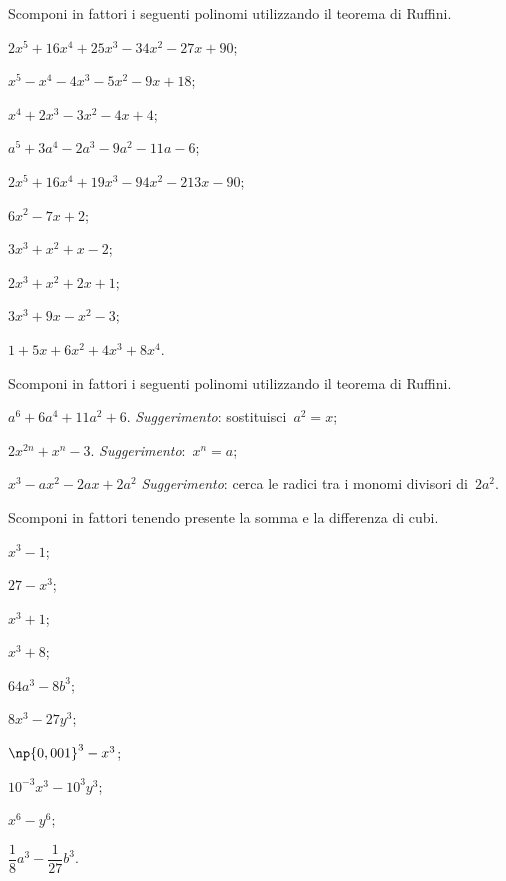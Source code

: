 \begin{esercizio}[\Ast]
\label{ese:13.83}
Scomponi in fattori i seguenti polinomi utilizzando il teorema di
Ruffini.
\begin{multicols}{2}
 \begin{enumeratea}
 \item $2x^{5}+16x^{4}+25x^{3}-34x^{2}-27x+90$;
\item $x^{5}-x^{4}-4x^{3}-5x^{2}-9x+18$;
\item $x^{4}+2x^{3}-3x^{2}-4x+4$;
\item $a^{5}+3a^{4}-2a^{3}-9a^{2}-11a-6$;
\item $2x^{5}+16x^{4}+19x^{3}-94x^{2}-213x-90$;
\item $6x^{2}-7x+2$;
\item $3x^{3}+x^{2}+x-2$;
\item $2x^{3}+x^{2}+2x+1$;
\item $3x^{3}+9x-x^{2}-3$;
\item $1+5x+6x^{2}+4x^{3}+8x^{4}$.
 \end{enumeratea}
\end{multicols}
\end{esercizio}

\begin{esercizio}[\Ast]
\label{ese:13.84}
Scomponi in fattori i seguenti polinomi utilizzando il teorema di
Ruffini.

 \begin{enumeratea}
 \item $a^{6}+6a^{4}+11a^{2}+6$. \emph{Suggerimento}: sostituisci~$a^{2}=x$;
\item $2x^{2n}+x^{n}-3$. \emph{Suggerimento}:~$x^{n}=a$;
\item $x^{3}-ax^{2}-2ax+2a^{2}$ \emph{Suggerimento}: cerca le radici tra i
monomi divisori di~$2a^{2}$.
 \end{enumeratea}
\end{esercizio}

\pagebreak
\begin{esercizio}
\label{ese:13.85}
 Scomponi in fattori tenendo presente la somma e la differenza di cubi.
 \begin{multicols}{3}
 \begin{enumeratea}
  \item $x^{3}-1$;
\item $27-x^{3}$;
\item $x^{3}+1$;
\item $x^{3}+8$;
\item $64a^{3}-8b^{3}$;
\item $8x^{3}-27y^{3}$;
\item $\np{0,001}^{3}-x^{3}$;
\item $10^{-3}x^{3}-10^{3}y^{3}$;
\item $x^{6}-y^{6}$;
\item $\dfrac{1}{8}a^{3}-\dfrac{1}{27}b^{3}$.
 \end{enumeratea}
 \end{multicols}
\end{esercizio}

